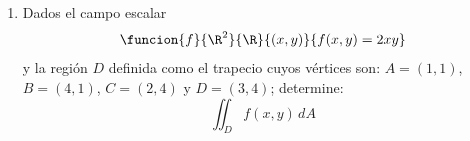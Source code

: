 \documentclass[a4,11pt]{aleph-examen}
\begin{document}
\begin{preguntas}
\begin{respuesta}
\begin{respuesta}
\begin{respuesta}
\begin{enumerate}
\begin{respuesta}
\begin{itemize}
	\item 
    	Respecto a $dy dx$, se tiene que
		\[
			\iint_D f dA=
			\int_{0}^2\int_{\frac{2-\sqrt{4-2y}}{2}}^{2-\sqrt{\frac{2}{y}}} x dx dy.
		\]
	\end{itemize}
\end{respuesta}

\item 
    Dados el campo escalar
    \[
        \funcion{f}{\R^2}{\R}{(x,y)}{f(x,y)=2xy}
    \]
    y la región $D$ definida como el trapecio cuyos vértices son: $A=(1,1)$, $B=(4,1)$, $C=(2,4)$ y $D=(3,4)$; determine:
    \[
        \iint_D f(x,y) \,dA
    \]


\end{enumerate}
\end{respuesta}
\end{respuesta}
\end{respuesta}
\end{preguntas}
\end{document}
